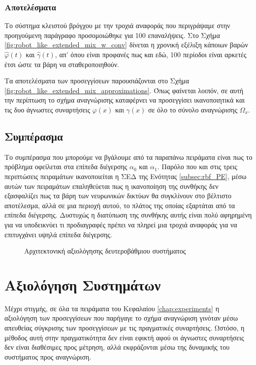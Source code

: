 \subsubsection{Αποτελέσματα}
Το σύστημα κλειστού βρόγχου με την τροχιά αναφοράς που περιγράψαμε στην προηγούμενη παράγραφο προσομοιώθηκε για 100 επαναλήψεις. Στο Σχήμα \ref{fig:robot_like_extended_mix_w_conv} δίνεται η χρονική εξέλιξη κάποιων βαρών $\hat{\varphi}(t)$ και $\hat{\gamma}(t)$, απ' όπου είναι προφανές πως και εδώ, 100 περίοδοι είναι αρκετές έτσι ώστε τα βάρη να σταθεροποιηθούν.

Τα αποτελέσματα των προσεγγίσεων παρουσιάζονται στο Σχήμα \ref{fig:robot_like_extended_mix_approximations}. Όπως φαίνεται λοιπόν, σε αυτή την περίπτωση το σχήμα αναγνώρισης καταφέρνει να προσεγγίσει ικανοποιητικά και τις δυο άγνωστες συναρτήσεις $\varphi(x)$ και $\gamma(x)$ σε όλο το σύνολο αναγνώρισης $\Omega_x$.

\subsection{Συμπέρασμα}
Το συμπέρασμα που μπορούμε να βγάλουμε από τα παραπάνω πειράματα είναι πως το πρόβλημα οφείλεται στα επίπεδα διέγερσης $\alpha_0$ και $\alpha_1$. Παρόλο που και στις τρεις περιπτώσεις πειραμάτων ικανοποιείται η ΣΕΔ της Ενότητας \ref{subsec:rbf_PE}, μέσω αυτών των πειραμάτων επαληθεύεται πως η ικανοποίηση της συνθήκης δεν εξασφαλίζει πως τα βάρη των νευρωνικών δικτύων θα συγκλίνουν στο βέλτιστο αποτέλεσμα, αλλά σε μια περιοχή αυτού, το πλάτος της οποίας εξαρτάται από τα επίπεδα διέγερσης. Δυστυχώς η διατύπωση της συνθήκης αυτής είναι πολύ αφηρημένη για να υποδεικνύει τι προδιαγραφές πρέπει να πληρεί μια τροχιά αναφοράς για να επιτυγχάνει υψηλά επίπεδα διέγερσης.

\begin{figure}
	\centering
	
	\caption{Αρχιτεκτονική αξιολόγησης δευτεροβάθμιου συστήματος}
	\label{fig:validation_schema}
\end{figure}

\section{Αξιολόγηση Συστημάτων}
Μέχρι στιγμής, σε όλα τα πειράματα του Κεφαλαίου \ref{chap:experiments} η αξιολόγηση των προσεγγίσεων που παρήγαγε το σχήμα αναγνώριση γινόταν μέσω απευθείας σύγκρισης των προσεγγίσεων με τις πραγματικές συναρτήσεις. Ωστόσο, η μέθοδος αυτή στην πραγματικότητα δεν είναι εφικτή αφού οι άγνωστες συναρτήσεις δεν είναι διαθέσιμες προς μέτρηση, αλλά εκφράζονται μέσω της δυναμικής του συστήματος προς αναγνώριση.

